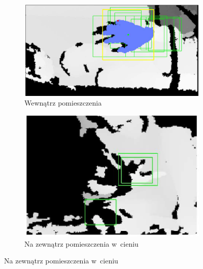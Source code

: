 \begin{savenotes}
	\begin{figure}[!htb]
		\captionsetup{singlelinecheck=off}
		\centering
		\begin{subfigure}[b]{0.3\textwidth}
			\centering
			\includegraphics[width=\linewidth]{images/kinectIndoor.png}	
			\caption{Wewnątrz pomieszczenia}
			\label{fig:characteristics:kinect:depthMapA}
		\end{subfigure}
																																								
		\begin{subfigure}[b]{0.3\textwidth}
			\centering
			\includegraphics[width=\linewidth]{images/kinecOutdoorShade.png}		
			\caption{Na zewnątrz pomieszczenia w~cieniu}
			\label{fig:characteristics:kinect:depthMapB}
		\end{subfigure}
																																			

\end{figure}
\end{savenotes}
